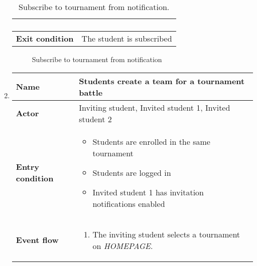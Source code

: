 \begin{enumerate}[label=\textbf{UC\arabic*}:,leftmargin=1.3cm]
\begin{table}[H]
\begin{tabular}{|l|p{11.9cm}|}
\begin{enumerate}[label=\arabic*.]
                  \end{enumerate} \\\hline
                  \textbf{Exit condition}  & The student is subscribed                                                             \\\hline
              \end{tabular}
              \caption{Subscribe to tournament from notification.}
              \label{table:Subscribe to tournament from notification}
          \end{table}

          \begin{figure}[H]
              \centering
              \caption{Subscribe to tournament from notification}
              \label{fig:Subscribe to tournament from notification}
          \end{figure}
          \pagebreak
    \item \textbf{}
          \begin{table}[H]
              \centering
              \begin{tabular}{|l|p{11.9cm}|}
                  \hline
                  \textbf{Name}            & Students create a team for a tournament battle                              \\\hline
                  \textbf{Actor}           & Inviting student, Invited student 1, Invited student 2                      \\\hline
                  \textbf{Entry condition} &
                  \begin{itemize}
                      \item Students are enrolled in the same tournament
                      \item Students are logged in
                      \item Invited student 1 has invitation notifications enabled
                  \end{itemize}                                            \\\hline
                  \textbf{Event flow}      &
                  \begin{enumerate}[label=\arabic*.]
                      \item The inviting student selects a tournament on \emph{HOMEPAGE}.

\end{enumerate}
\end{tabular}
\end{table}
\end{enumerate}
